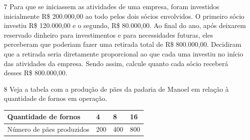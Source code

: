 \begin{emptybox}
\end{emptybox}


\pagebreak
\num{7} Para que se iniciassem as atividades de uma empresa, foram investidos
inicialmente R\$ 200.000,00 ao todo pelos dois sócios envolvidos. O primeiro
sócio investiu R\$ 120.000,00 e o segundo, R\$ 80.000,00. Ao final do ano,
após deixarem reservado dinheiro para investimentos e para necessidades
futuras, eles perceberam que poderiam fazer uma retirada total de R\$ 800.000,00. Decidiram que a retirada seria diretamente proporcional ao que
cada uma investiu no início das atividades da empresa. Sendo assim,
calcule quanto cada sócio receberá desses R\$ 800.000,00.

\begin{emptybox}
\end{emptybox}

\num{8} Veja a tabela com a produção de pães da padaria de Manoel em relação à quantidade de fornos em operação.

\begin{center}
\begin{tabular}{l|l|l|l}
\hline
Quantidade de fornos & 4 & 8 & 16 \\ \hline
Número de pães produzidos & 200 & 400 & 800 \\ \hline
\end{tabular}
\end{center}

